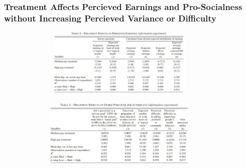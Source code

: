 \documentclass{beamer}
\begin{document}
\begin{frame}
\frametitle{Treatment Affects Percieved Earnings and Pro-Socialness without Increasing Percieved Variance or Difficulty}
\begin{figure}
    \includegraphics[width=10cm,height=3.25cm]{Deserranno_Table2} 
     \end{figure}
\begin{figure}
    \includegraphics[width=10cm,height=3.25cm]{Deserranno_Table3} 
     \end{figure}



\end{frame}
\end{document}
